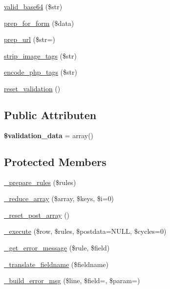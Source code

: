 \begin{DoxyCompactItemize}
\mbox{\hyperlink{class_c_i___form__validation_a9bec2f0a508e0327d4b048ecfc204522}{valid\+\_\+base64}} (\$str)
\item 
\mbox{\hyperlink{class_c_i___form__validation_a53938e0a994c9995de5c979ecb27bf1d}{prep\+\_\+for\+\_\+form}} (\$data)
\item 
\mbox{\hyperlink{class_c_i___form__validation_a1218a70d68fe797013a53b3c7cd41d2f}{prep\+\_\+url}} (\$str=\textquotesingle{}\textquotesingle{})
\item 
\mbox{\hyperlink{class_c_i___form__validation_abb836a42971c7bc641588db779c6ab1d}{strip\+\_\+image\+\_\+tags}} (\$str)
\item 
\mbox{\hyperlink{class_c_i___form__validation_ae8fff4cb083a2a66c900f8bd61216bdd}{encode\+\_\+php\+\_\+tags}} (\$str)
\item 
\mbox{\hyperlink{class_c_i___form__validation_a84b8bd64032f6be532968015cba11361}{reset\+\_\+validation}} ()
\end{DoxyCompactItemize}
\subsection*{Public Attributen}
\begin{DoxyCompactItemize}
\item 
\mbox{\label{class_c_i___form__validation_af1df05337bb40c1d30c3d8c62fe8696c}} 
{\bfseries \$validation\+\_\+data} = array()
\end{DoxyCompactItemize}
\subsection*{Protected Members}
\begin{DoxyCompactItemize}
\item 
\mbox{\hyperlink{class_c_i___form__validation_ada388c3a7f360165699597f638faf127}{\+\_\+prepare\+\_\+rules}} (\$rules)
\item 
\mbox{\hyperlink{class_c_i___form__validation_a20ed7e44a35f5a5f6db5a6b220151df0}{\+\_\+reduce\+\_\+array}} (\$array, \$keys, \$i=0)
\item 
\mbox{\hyperlink{class_c_i___form__validation_a5cb72e21d23a62d15655b8caaa493698}{\+\_\+reset\+\_\+post\+\_\+array}} ()
\item 
\mbox{\hyperlink{class_c_i___form__validation_a00fc7d98650d07098dd4a13b486c3dea}{\+\_\+execute}} (\$row, \$rules, \$postdata=N\+U\+LL, \$cycles=0)
\item 
\mbox{\hyperlink{class_c_i___form__validation_a1c0eda169a1c36fe0bcc61a863690297}{\+\_\+get\+\_\+error\+\_\+message}} (\$rule, \$field)
\item 
\mbox{\hyperlink{class_c_i___form__validation_ae6b1edc93754376c05622d905845c215}{\+\_\+translate\+\_\+fieldname}} (\$fieldname)
\item 
\mbox{\hyperlink{class_c_i___form__validation_a970cb9f78d6cefc93e795d4d72e085af}{\+\_\+build\+\_\+error\+\_\+msg}} (\$line, \$field=\textquotesingle{}\textquotesingle{}, \$param=\textquotesingle{}\textquotesingle{})
\end{DoxyCompactItemize}
